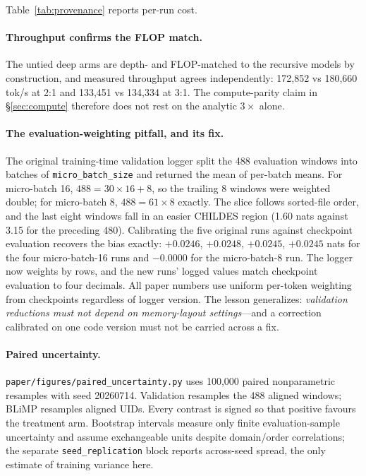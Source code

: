 \documentclass[11pt]{article}
\begin{document}
Table~\ref{tab:provenance} reports per-run cost.

\paragraph{Throughput confirms the FLOP match.} The untied deep arms are depth- and FLOP-matched to the recursive models by construction, and measured throughput agrees independently: 172{,}852 vs 180{,}660 tok/s at 2:1 and 133{,}451 vs 134{,}334 at 3:1. The compute-parity claim in \S\ref{sec:compute} therefore does not rest on the analytic $3\times$ alone.

\paragraph{The evaluation-weighting pitfall, and its fix.} The original training-time validation logger split the 488 evaluation windows into batches of \texttt{micro\_batch\_size} and returned the mean of per-batch means. For micro-batch 16, $488 = 30\times16 + 8$, so the trailing 8 windows were weighted double; for micro-batch 8, $488 = 61\times8$ exactly. The slice follows sorted-file order, and the last eight windows fall in an easier CHILDES region (1.60 nats against 3.15 for the preceding 480). Calibrating the five original runs against checkpoint evaluation recovers the bias exactly: $+0.0246$, $+0.0248$, $+0.0245$, $+0.0245$ nats for the four micro-batch-16 runs and $-0.0000$ for the micro-batch-8 run. The logger now weights by rows, and the new runs' logged values match checkpoint evaluation to four decimals. All paper numbers use uniform per-token weighting from checkpoints regardless of logger version. The lesson generalizes: \emph{validation reductions must not depend on memory-layout settings}---and a correction calibrated on one code version must not be carried across a fix.

\paragraph{Paired uncertainty.} \texttt{paper/figures/paired\_uncertainty.py} uses 100{,}000 paired nonparametric resamples with seed 20260714. Validation resamples the 488 aligned windows; BLiMP resamples aligned UIDs. Every contrast is signed so that positive favours the treatment arm. Bootstrap intervals measure only finite evaluation-sample uncertainty and assume exchangeable units despite domain/order correlations; the separate \texttt{seed\_replication} block reports across-seed spread, the only estimate of training variance here.
\end{document}
